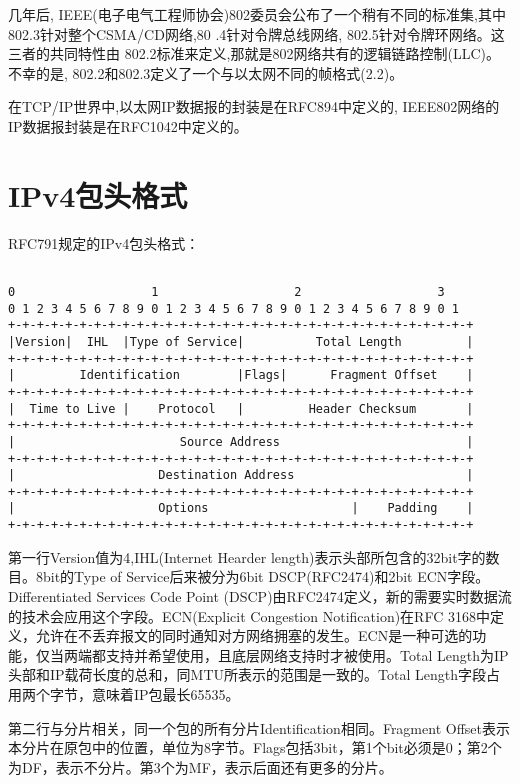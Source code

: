 几年后, IEEE(电子电气工程师协会)802委员会公布了一个稍有不同的标准集,其中802.3针对整个CSMA/CD网络,80 .4针对令牌总线网络, 802.5针对令牌环网络。这三者的共同特性由 802.2标准来定义,那就是802网络共有的逻辑链路控制(LLC)。不幸的是, 802.2和802.3定义了一个与以太网不同的帧格式(\cite{tcpipill}2.2)。

在TCP/IP世界中,以太网IP数据报的封装是在RFC894中定义的, IEEE802网络的IP数据报封装是在RFC1042中定义的。

\section{IPv4包头格式}
RFC791规定的IPv4包头格式：
\begin{center}
\begin{lstlisting}

0                   1                   2                   3
0 1 2 3 4 5 6 7 8 9 0 1 2 3 4 5 6 7 8 9 0 1 2 3 4 5 6 7 8 9 0 1
+-+-+-+-+-+-+-+-+-+-+-+-+-+-+-+-+-+-+-+-+-+-+-+-+-+-+-+-+-+-+-+-+
|Version|  IHL  |Type of Service|          Total Length         |
+-+-+-+-+-+-+-+-+-+-+-+-+-+-+-+-+-+-+-+-+-+-+-+-+-+-+-+-+-+-+-+-+
|         Identification        |Flags|      Fragment Offset    |
+-+-+-+-+-+-+-+-+-+-+-+-+-+-+-+-+-+-+-+-+-+-+-+-+-+-+-+-+-+-+-+-+
|  Time to Live |    Protocol   |         Header Checksum       |
+-+-+-+-+-+-+-+-+-+-+-+-+-+-+-+-+-+-+-+-+-+-+-+-+-+-+-+-+-+-+-+-+
|                       Source Address                          |
+-+-+-+-+-+-+-+-+-+-+-+-+-+-+-+-+-+-+-+-+-+-+-+-+-+-+-+-+-+-+-+-+
|                    Destination Address                        |
+-+-+-+-+-+-+-+-+-+-+-+-+-+-+-+-+-+-+-+-+-+-+-+-+-+-+-+-+-+-+-+-+
|                    Options                    |    Padding    |
+-+-+-+-+-+-+-+-+-+-+-+-+-+-+-+-+-+-+-+-+-+-+-+-+-+-+-+-+-+-+-+-+
\end{lstlisting}
\end{center}

第一行Version值为4,IHL(Internet Hearder length)表示头部所包含的32bit字的数目。8bit的Type of Service后来被分为6bit DSCP(RFC2474)和2bit ECN字段。Differentiated Services Code Point (DSCP)由RFC2474定义，新的需要实时数据流的技术会应用这个字段。ECN(Explicit Congestion Notification)在RFC 3168中定义，允许在不丢弃报文的同时通知对方网络拥塞的发生。ECN是一种可选的功能，仅当两端都支持并希望使用，且底层网络支持时才被使用。Total Length为IP头部和IP载荷长度的总和，同MTU所表示的范围是一致的。Total Length字段占用两个字节，意味着IP包最长65535。

第二行与分片相关，同一个包的所有分片Identification相同。Fragment Offset表示本分片在原包中的位置，单位为8字节。Flags包括3bit，第1个bit必须是0；第2个为DF，表示不分片。第3个为MF，表示后面还有更多的分片。

